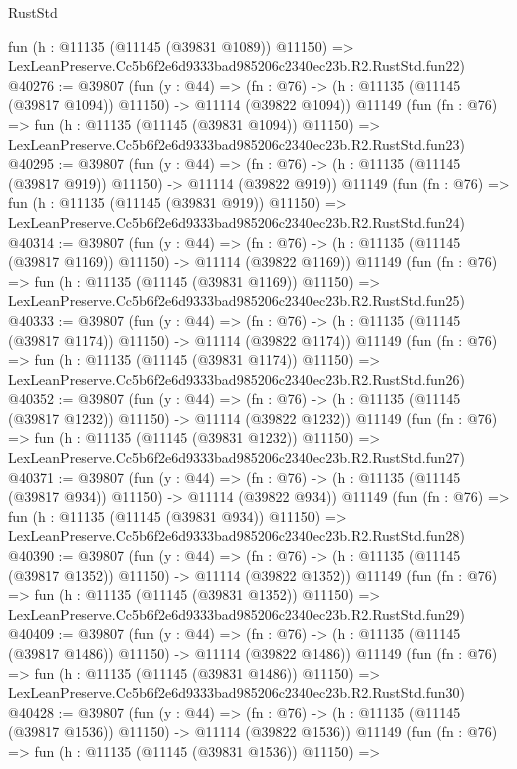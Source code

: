 \begin{lexlean}{RustStd}
\begin{coremodule}
    fun (h : @11135 (@11145 (@39831 @1089)) @11150) =>
    LexLeanPreserve.Cc5b6f2e6d9333bad985206c2340ec23b.R2.RustStd.fun22)
@40276 := @39807
    (fun (y : @44) =>
    (fn : @76) -> (h : @11135 (@11145 (@39817 @1094)) @11150) -> @11114 (@39822 @1094))
    @11149
    (fun (fn : @76) =>
    fun (h : @11135 (@11145 (@39831 @1094)) @11150) =>
    LexLeanPreserve.Cc5b6f2e6d9333bad985206c2340ec23b.R2.RustStd.fun23)
@40295 := @39807
    (fun (y : @44) =>
    (fn : @76) -> (h : @11135 (@11145 (@39817 @919)) @11150) -> @11114 (@39822 @919))
    @11149
    (fun (fn : @76) =>
    fun (h : @11135 (@11145 (@39831 @919)) @11150) =>
    LexLeanPreserve.Cc5b6f2e6d9333bad985206c2340ec23b.R2.RustStd.fun24)
@40314 := @39807
    (fun (y : @44) =>
    (fn : @76) -> (h : @11135 (@11145 (@39817 @1169)) @11150) -> @11114 (@39822 @1169))
    @11149
    (fun (fn : @76) =>
    fun (h : @11135 (@11145 (@39831 @1169)) @11150) =>
    LexLeanPreserve.Cc5b6f2e6d9333bad985206c2340ec23b.R2.RustStd.fun25)
@40333 := @39807
    (fun (y : @44) =>
    (fn : @76) -> (h : @11135 (@11145 (@39817 @1174)) @11150) -> @11114 (@39822 @1174))
    @11149
    (fun (fn : @76) =>
    fun (h : @11135 (@11145 (@39831 @1174)) @11150) =>
    LexLeanPreserve.Cc5b6f2e6d9333bad985206c2340ec23b.R2.RustStd.fun26)
@40352 := @39807
    (fun (y : @44) =>
    (fn : @76) -> (h : @11135 (@11145 (@39817 @1232)) @11150) -> @11114 (@39822 @1232))
    @11149
    (fun (fn : @76) =>
    fun (h : @11135 (@11145 (@39831 @1232)) @11150) =>
    LexLeanPreserve.Cc5b6f2e6d9333bad985206c2340ec23b.R2.RustStd.fun27)
@40371 := @39807
    (fun (y : @44) =>
    (fn : @76) -> (h : @11135 (@11145 (@39817 @934)) @11150) -> @11114 (@39822 @934))
    @11149
    (fun (fn : @76) =>
    fun (h : @11135 (@11145 (@39831 @934)) @11150) =>
    LexLeanPreserve.Cc5b6f2e6d9333bad985206c2340ec23b.R2.RustStd.fun28)
@40390 := @39807
    (fun (y : @44) =>
    (fn : @76) -> (h : @11135 (@11145 (@39817 @1352)) @11150) -> @11114 (@39822 @1352))
    @11149
    (fun (fn : @76) =>
    fun (h : @11135 (@11145 (@39831 @1352)) @11150) =>
    LexLeanPreserve.Cc5b6f2e6d9333bad985206c2340ec23b.R2.RustStd.fun29)
@40409 := @39807
    (fun (y : @44) =>
    (fn : @76) -> (h : @11135 (@11145 (@39817 @1486)) @11150) -> @11114 (@39822 @1486))
    @11149
    (fun (fn : @76) =>
    fun (h : @11135 (@11145 (@39831 @1486)) @11150) =>
    LexLeanPreserve.Cc5b6f2e6d9333bad985206c2340ec23b.R2.RustStd.fun30)
@40428 := @39807
    (fun (y : @44) =>
    (fn : @76) -> (h : @11135 (@11145 (@39817 @1536)) @11150) -> @11114 (@39822 @1536))
    @11149
    (fun (fn : @76) =>
    fun (h : @11135 (@11145 (@39831 @1536)) @11150) =>

\end{coremodule}
\end{lexlean}
